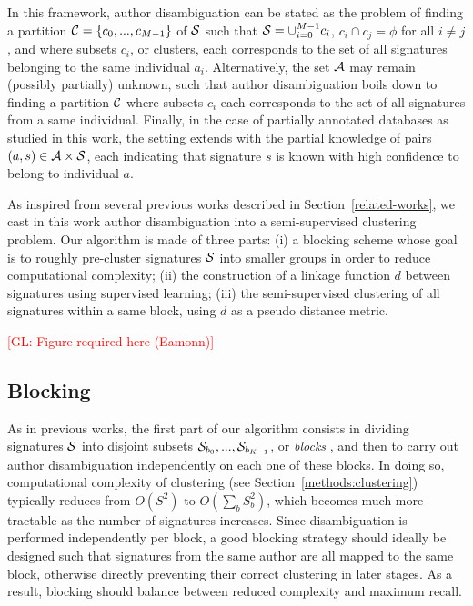\documentclass{article}
\newcommand{\glnote}[1]{\textcolor{red}{[GL: #1]}}
\begin{document}
In this
framework, author disambiguation can be stated as the problem of
finding a partition ${\cal C} = \{ c_0, ..., c_{M-1} \}$ of ${\cal S}$ such
that ${\cal S} = \cup_{i=0}^{M-1} c_i$, $c_i \cap c_j = \phi$ for all $i \neq
j$, and where subsets $c_i$, or clusters, each corresponds to the set of all
signatures belonging to the same individual $a_i$. Alternatively, the set
${\cal A}$ may remain (possibly partially) unknown, such that author
disambiguation boils down to finding a partition ${\cal C}$ where
subsets $c_i$  each corresponds to the set of all signatures from a same
individual. Finally, in the case of partially annotated databases as studied in
this work, the setting extends with the partial knowledge of pairs $(a, s) \in
{\cal A} \times {\cal S}$, each indicating that signature $s$ is known with high confidence
to belong to individual $a$.

As inspired from several previous works described in Section~\ref{related-works},
we cast in this work author disambiguation into a semi-supervised clustering
problem.  Our algorithm is made of three parts: (i) a blocking
scheme whose goal is to roughly pre-cluster signatures ${\cal S}$ into smaller groups in order to
reduce computational complexity; (ii) the construction of a linkage function
$d$ between signatures using supervised learning; (iii) the
semi-supervised clustering of all signatures within a same block, using $d$ as a pseudo distance metric.

\glnote{Figure required here (Eamonn)}

\subsection{Blocking}
\label{methods:blocking}

As in previous works, the first part of our algorithm consists in dividing
signatures ${\cal S}$ into disjoint subsets ${\cal S}_{b_0}, ..., {\cal
S}_{b_{K-1}}$, or \textit{blocks} \citep{fellegi69}, and then to carry out
author disambiguation independently on each one of these blocks. In doing so,
computational complexity of clustering (see Section~\ref{methods:clustering})
typically reduces from $O(S^2)$ to $O(\sum_b S_b^2)$, which becomes much more
tractable as the number of signatures increases. Since disambiguation is
performed independently per block, a good blocking strategy should ideally be
designed such that signatures from the same author are all mapped to the same
block, otherwise directly preventing their correct clustering in later stages. As a
result, blocking should balance between reduced complexity and maximum recall.
\end{document}

